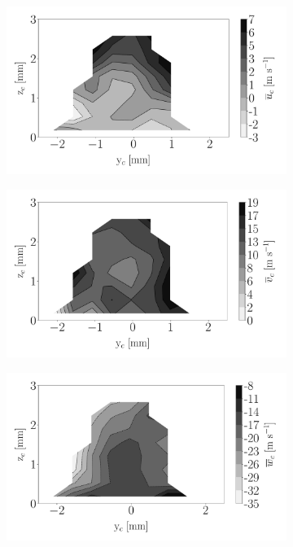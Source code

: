 \begin{figure}[h!]
\begin{subfigure}[b]{0.3\textwidth}
	\centering
   \includegraphics[scale=\scaleSLIBIMER]{./part3_applications/figures_ch8_resolved/injectors_SLI/dx10_xD05p00_ux_mean_map}
\end{subfigure}
   \hspace{0.17in}
\begin{subfigure}[b]{0.3\textwidth}
	\centering
   \includegraphics[scale=\scaleSLIBIMER]{./part3_applications/figures_ch8_resolved/injectors_SLI/dx10_xD05p00_uy_mean_map}
\end{subfigure}
   \hspace{0.17in}
\begin{subfigure}[b]{0.3\textwidth}
	\centering
   \includegraphics[scale=\scaleSLIBIMER]{./part3_applications/figures_ch8_resolved/injectors_SLI/dx10_xD05p00_uz_mean_map}

\end{subfigure}
\end{figure}
